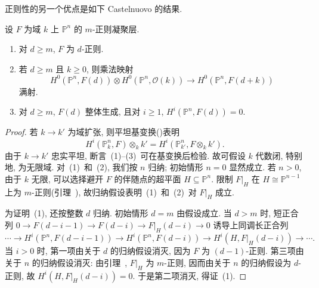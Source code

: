 正则性的另一个优点是如下 Castelnuovo 的结果.
\begin{proposition}[正则性的性质]\label{src:2.3.5}
设 $F$ 为域 $k$ 上 $\mathbb P^n$ 的 $m$-正则凝聚层.
\begin{enumerate}[(1)]
\item 对 $d\geq m$, $F$ 为 $d$-正则.
\item 若 $d\geq m$ 且 $k\geq0$, 则乘法映射
\[
H^0(\mathbb P^n,F(d))\otimes H^0(\mathbb P^n,\mathcal O(k))
\longrightarrow H^0(\mathbb P^n,F(d+k))
\]
满射.
\item 对 $d\geq m$, $F(d)$ 整体生成, 且对 $i\geq1$, $H^i(\mathbb P^n,F(d))=0$.
\end{enumerate}
\end{proposition}
\begin{proof}
若 $k\to k'$ 为域扩张, 则平坦基变换()表明
\[
H^i(\mathbb P_k^n,F)\otimes_k k'
=H^i(\mathbb P_{k'}^n,F\otimes_k k').
\]
由于 $k\to k'$ 忠实平坦, 断言~(1)--(3)~可在基变换后检验.
故可假设 $k$ 代数闭, 特别地, 为无限域.
对~(1)~和~(2), 我们按 $n$ 归纳; 初始情形 $n=0$ 显然成立.
若 $n>0$, 由于 $k$ 无限, 可以选择避开 $F$ 的伴随点的超平面 $H\subseteq\mathbb P^n$.
限制 $F|_H$ 在 $H\cong\mathbb P^{n-1}$ 上为 $m$-正则(引理~), 故归纳假设表明~(1)~和~(2)~对 $F|_H$ 成立.

为证明~(1), 还按整数 $d$ 归纳. 初始情形 $d=m$ 由假设成立.
当 $d>m$ 时, 短正合列 $0\to F(d-i-1)\to F(d-i)\to F|_H(d-i)\to0$ 诱导上同调长正合列
\[
\cdots\longrightarrow H^i(\mathbb P^n,F(d-i-1))
\longrightarrow H^i(\mathbb P^n,F(d-i))
\longrightarrow H^i(H,F|_H(d-i))\longrightarrow\cdots.
\]
当 $i>0$ 时, 第一项由关于 $d$ 的归纳假设消灭, 因为 $F$ 为 $(d-1)$-正则.
第三项由关于 $n$ 的归纳假设消灭: 由引理~, $F|_H$ 为 $m$-正则, 因而由关于 $n$ 的归纳假设为 $d$-正则, 故 $H^i(H,F|_H(d-i))=0$.
于是第二项消灭, 得证~(1).


\end{proof}
